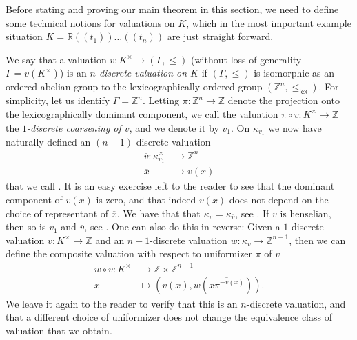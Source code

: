 \documentclass[a4paper,12pt,reqno]{amsart}
\theoremstyle{definition}
\numberwithin{equation}{thm}
\renewcommand{\leq}{\leqslant}
\begin{document}
Before stating and proving our main theorem in this section, 
we need to define some technical notions for valuations on $K$, which in the most important example situation  $K=\mathbb{R}(\!(t_1)\!)\ldots(\!(t_{n})\!)$ are just straight forward.

We say that a valuation  $v: K^\times \to (\Gamma,\leq)$ (without loss of generality $\Gamma=v(K^\times)$) is an \textit{$n$-discrete valuation on $K$} if $(\Gamma,\leq)$ is isomorphic as an ordered abelian group to the lexicographically ordered group $(\mathbb{Z}^{n},\leq_{\mathsf{lex}})$. 
For simplicity, let us identify $\Gamma= \mathbb{Z}^n$. Letting $\pi: \mathbb{Z}^n \to \mathbb{Z}$ denote the projection onto the lexicographically dominant component, we call the valuation $\pi \circ v: K^\times \to \mathbb{Z}$ the \textit{$1$-discrete coarsening of $v$}, and we denote it by $v_1$. 
On $\kappa_{v_1}$ we now have naturally defined an $(n-1)$-discrete valuation 
\begin{align*} 
\overline{v}: \kappa_{v_1}^\times  & \to \mathbb{Z}^{n} \\
                        \overline{x} & \mapsto v(x)
\end{align*}
that we call .
It is an easy exercise left to the reader to see that the dominant component of $v(x)$ is zero, and that indeed $v(x)$ does not depend on the choice of representant of $\overline{x}$.  We have that  that $\kappa_{v}=\kappa_{\overline{v}}$, see  \cite[Section 8]{EP05} . If $v$ is henselian, then so is $v_1$ and $\overline{v}$, see \cite[Corollary 4.1.4]{EP05}.  
One can also do this in reverse: Given a $1$-discrete valuation $v: K^\times \to \mathbb{Z}$ and an $n-1$-discrete valuation $w: \kappa_{v} \to \mathbb{Z}^{n-1}$, then we can define the composite valuation with respect to uniformizer $\pi$ of $v$ 
\begin{align*} 
w \circ v: K^\times  &\to \mathbb{Z} \times \mathbb{Z}^{n-1}  \\
    x &\mapsto (v(x), w(\overline{ x \pi^{-v(x)}} ) ).
\end{align*}  
We leave it again to the reader to verify that this is an $n$-discrete valuation, and that a different choice of uniformizer does not change the equivalence class of valuation that we obtain. 
\end{document}
